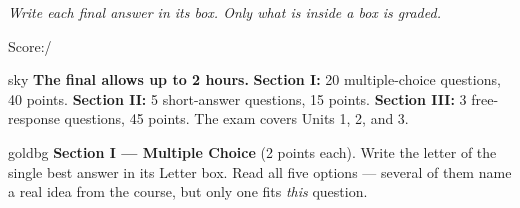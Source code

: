 \documentclass[12pt]{article}
\begin{document}
{\small\itshape Write each final answer in its box. Only what is inside a box is graded.}\par

\hfill\small Score:\;\blank{1.3cm}\;/\normalsize
\vspace{0.06in}

\boxguard[8]
\begin{headlinebox}{sky}
\small
\textbf{The final allows up to 2 hours.} \textbf{Section I:} 20 multiple-choice questions, 40
points. \textbf{Section II:} 5 short-answer questions, 15 points. \textbf{Section III:} 3
free-response questions, 45 points. The exam covers Units 1, 2, and 3.
\end{headlinebox}

\vspace{0.08in}

\boxguard[10]
\begin{headlinebox}{goldbg}
\small
\textbf{Section I --- Multiple Choice} (2 points each). Write the letter of the single best answer in its Letter box. Read all
five options --- several of them name a real idea from the course, but only one fits \emph{this}
question.
\end{headlinebox}

\vspace{0.10in}
\end{document}
